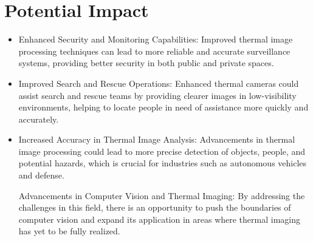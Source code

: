 \documentclass[11pt,a4paper]{report}
\begin{document}
\section{Potential Impact}
\begin{itemize} 
    \item Enhanced Security and Monitoring Capabilities: Improved thermal image processing techniques can lead to more reliable and accurate surveillance systems, providing better security in both public and private spaces.

    \item Improved Search and Rescue Operations: Enhanced thermal cameras could assist search and rescue teams by providing clearer images in low-visibility environments, helping to locate people in need of assistance more quickly and accurately.

    \item Increased Accuracy in Thermal Image Analysis: Advancements in thermal image processing could lead to more precise detection of objects, people, and potential hazards, which is crucial for industries such as autonomous vehicles and defense.

Advancements in Computer Vision and Thermal Imaging: By addressing the challenges in this field, there is an opportunity to push the boundaries of computer vision and expand its application in areas where thermal imaging has yet to be fully realized.
\end{itemize}  
\end{document}
